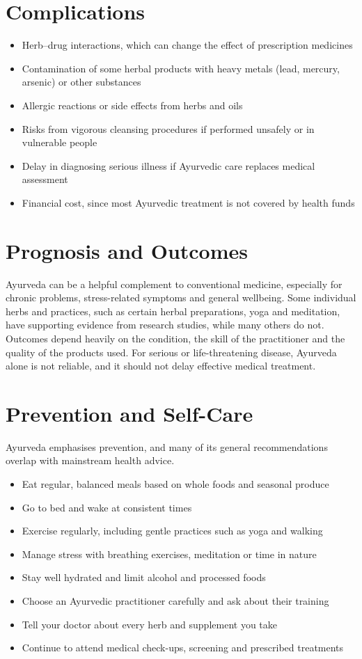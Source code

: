 \section*{Complications}
\begin{itemize}
    \item Herb--drug interactions, which can change the effect of prescription medicines
    \item Contamination of some herbal products with heavy metals (lead, mercury, arsenic) or other substances
    \item Allergic reactions or side effects from herbs and oils
    \item Risks from vigorous cleansing procedures if performed unsafely or in vulnerable people
    \item Delay in diagnosing serious illness if Ayurvedic care replaces medical assessment
    \item Financial cost, since most Ayurvedic treatment is not covered by health funds
\end{itemize}

\section*{Prognosis and Outcomes}
Ayurveda can be a helpful complement to conventional medicine, especially for chronic problems, stress-related symptoms and general wellbeing. Some individual herbs and practices, such as certain herbal preparations, yoga and meditation, have supporting evidence from research studies, while many others do not. Outcomes depend heavily on the condition, the skill of the practitioner and the quality of the products used. For serious or life-threatening disease, Ayurveda alone is not reliable, and it should not delay effective medical treatment.

\section*{Prevention and Self-Care}
Ayurveda emphasises prevention, and many of its general recommendations overlap with mainstream health advice.

\begin{itemize}
    \item Eat regular, balanced meals based on whole foods and seasonal produce
    \item Go to bed and wake at consistent times
    \item Exercise regularly, including gentle practices such as yoga and walking
    \item Manage stress with breathing exercises, meditation or time in nature
    \item Stay well hydrated and limit alcohol and processed foods
    \item Choose an Ayurvedic practitioner carefully and ask about their training
    \item Tell your doctor about every herb and supplement you take
    \item Continue to attend medical check-ups, screening and prescribed treatments
\end{itemize}

